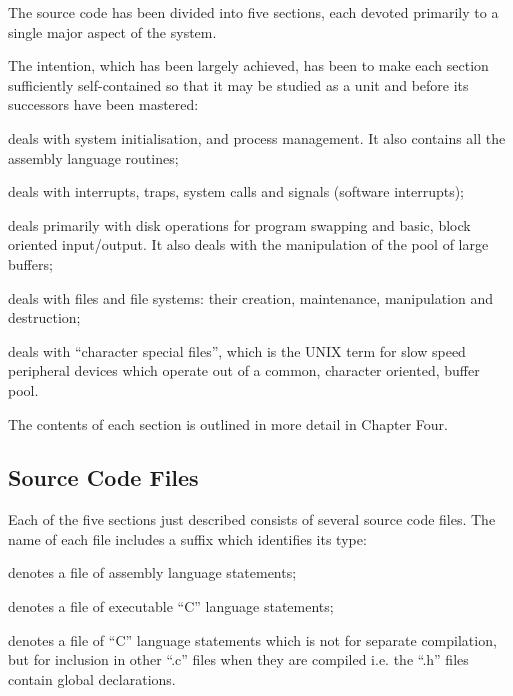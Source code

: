 The source code has been divided into
five sections, each devoted primarily
to a single major aspect of the system.

The intention, which has been largely
achieved, has been to make each section
sufficiently self-contained so that it
may be studied as a unit and before its
successors have been mastered:

\bd
\item[Section One] deals with system initialisation,
and process management. It also contains all the
assembly language routines;

\item[Section Two] deals with interrupts,
traps, system calls and signals
(software interrupts);

\item[Section Three] deals primarily with
disk operations for program swapping and
basic, block oriented
input/output. It also deals with
the manipulation of the pool of
large buffers;

\item[Section Four] deals with files and
file systems: their creation,
maintenance, manipulation and destruction;

\item[Section Five] deals with ``character
special files'', which is the UNIX
term for slow speed peripheral
devices which operate out of a
common, character oriented, buffer
pool.
\ed

The contents of each section is outlined
in more detail in Chapter Four.

\subsection{Source Code Files}

Each of the five sections just
described consists of several source
code files. The name of each file
includes a suffix which identifies its
type:

\bd
\item[``.s''] denotes a file of assembly
 language statements;

\item[``.c''] denotes a file of executable ``C''
 language statements;

\item[``.h''] denotes a file of ``C'' language
 statements which is not for
 separate compilation, but for
 inclusion in other ``.c'' files
 when they are compiled i.e. the
 ``.h'' files contain global
 declarations.
\ed

